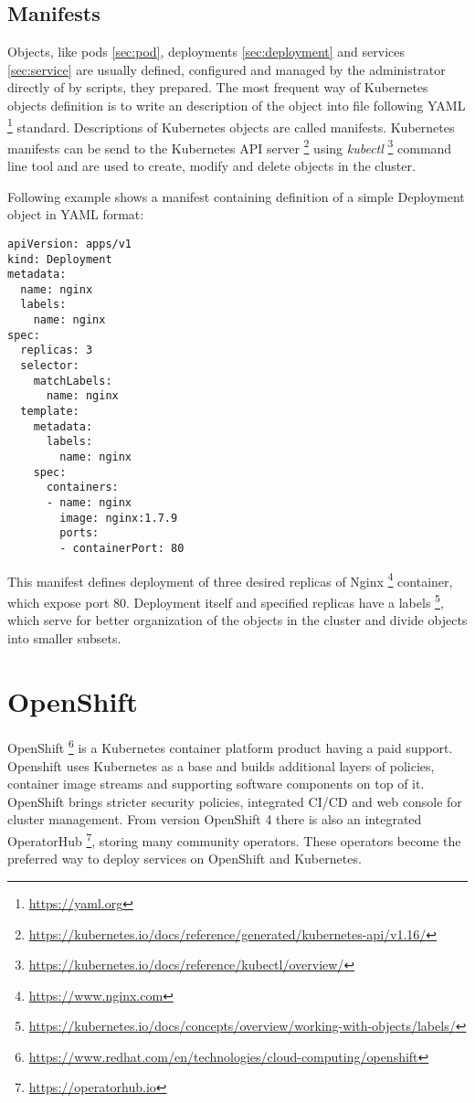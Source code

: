 \documentclass[
  digital, %
  twoside, %
  table,   %
  lof,     %
  lot,     %
]{fithesis3}
\begin{document}
\subsection{Manifests} \label{sec:manifest}
Objects, like pods \ref{sec:pod}, deployments \ref{sec:deployment} and services \ref{sec:service} are usually defined, configured and managed by the administrator directly of by scripts, they prepared. The most frequent way of Kubernetes objects definition is to write an description of the object into file following YAML \footnote{\url{https://yaml.org}} standard. Descriptions of Kubernetes objects are called manifests. Kubernetes manifests can be send to the Kubernetes API server \footnote{\url{https://kubernetes.io/docs/reference/generated/kubernetes-api/v1.16/}} using \textit{kubectl} \footnote{\url{https://kubernetes.io/docs/reference/kubectl/overview/}} command line tool and are used to create, modify and delete objects in the cluster.

Following example shows a manifest containing definition of a simple Deployment object in YAML format:
\begin{lstlisting}
apiVersion: apps/v1
kind: Deployment
metadata:
  name: nginx
  labels:
    name: nginx
spec:
  replicas: 3
  selector:
    matchLabels:
      name: nginx
  template:
    metadata:
      labels:
        name: nginx
    spec:
      containers:
      - name: nginx
        image: nginx:1.7.9
        ports:
        - containerPort: 80
\end{lstlisting}
This manifest defines deployment of three desired replicas of Nginx \footnote{\url{https://www.nginx.com}} container, which expose port 80. Deployment itself and specified replicas have a labels \footnote{\url{https://kubernetes.io/docs/concepts/overview/working-with-objects/labels/}}, which serve for better organization of the objects in the cluster and divide objects into smaller subsets.

\section{OpenShift}
OpenShift \footnote{\url{https://www.redhat.com/en/technologies/cloud-computing/openshift}} is a Kubernetes container platform product having a paid support. Openshift uses Kubernetes as a base and builds additional layers of policies, container image streams and supporting software components on top of it. OpenShift brings stricter security policies, integrated CI/CD and web console for cluster management. From version OpenShift 4 there is also an integrated OperatorHub \footnote{\url{https://operatorhub.io}}, storing many community operators. These operators become the preferred way to deploy services on OpenShift and Kubernetes.
\end{document}
